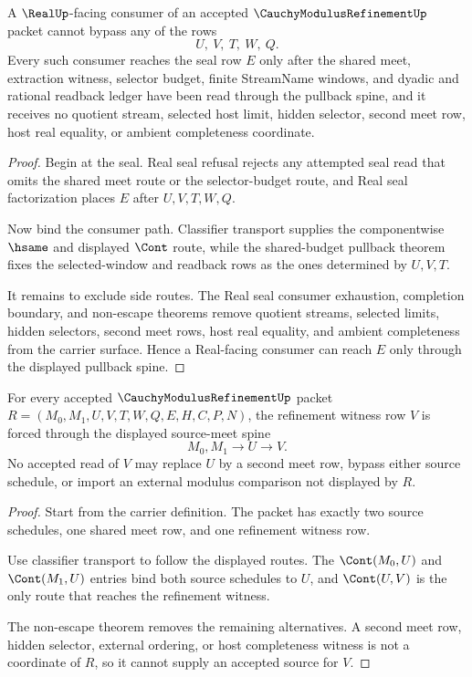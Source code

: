 \begin{theorem}
\label{thm:cauchy-modulus-refinement-real-seal-pullback-nonescape}
A $\RealUp$-facing consumer of an accepted $\CauchyModulusRefinementUp$ packet cannot bypass any of the rows
$$
U,\ V,\ T,\ W,\ Q.
$$
Every such consumer reaches the seal row $E$ only after the shared meet, extraction witness, selector budget, finite StreamName windows, and dyadic and rational readback ledger have been read through the pullback spine, and it receives no quotient stream, selected host limit, hidden selector, second meet row, host real equality, or ambient completeness coordinate.
\end{theorem}
\begin{proof}
Begin at the seal. Real seal refusal rejects any attempted seal read that omits the shared meet route or the selector-budget route, and Real seal factorization places $E$ after $U,V,T,W,Q$.

Now bind the consumer path. Classifier transport supplies the componentwise $\hsame$ and displayed $\Cont$ route, while the shared-budget pullback theorem fixes the selected-window and readback rows as the ones determined by $U,V,T$.

It remains to exclude side routes. The Real seal consumer exhaustion, completion boundary, and non-escape theorems remove quotient streams, selected limits, hidden selectors, second meet rows, host real equality, and ambient completeness from the carrier surface. Hence a Real-facing consumer can reach $E$ only through the displayed pullback spine.
\end{proof}

\begin{theorem}
\label{thm:cauchy-modulus-refinement-source-meet-exactness}
For every accepted $\CauchyModulusRefinementUp$ packet $R=(M_0,M_1,U,V,T,W,Q,E,H,C,P,N)$, the refinement witness row $V$ is forced through the displayed source-meet spine
$$
M_0,M_1 \longrightarrow U \longrightarrow V.
$$
No accepted read of $V$ may replace $U$ by a second meet row, bypass either source schedule, or import an external modulus comparison not displayed by $R$.
\end{theorem}
\begin{proof}
Start from the carrier definition. The packet has exactly two source schedules, one shared meet row, and one refinement witness row.

Use classifier transport to follow the displayed routes. The $\Cont(M_0,U)$ and $\Cont(M_1,U)$ entries bind both source schedules to $U$, and $\Cont(U,V)$ is the only route that reaches the refinement witness.

The non-escape theorem removes the remaining alternatives. A second meet row, hidden selector, external ordering, or host completeness witness is not a coordinate of $R$, so it cannot supply an accepted source for $V$.
\end{proof}

